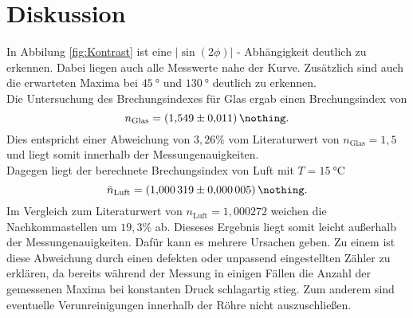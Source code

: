 \FloatBarrier
\newpage
\section{Diskussion}
In Abbilung \ref{fig:Kontrast} ist eine $|\sin{(2\phi)}|$ - Abhängigkeit deutlich zu erkennen.
Dabei liegen auch alle Messwerte nahe der Kurve.
Zusätzlich sind auch die erwarteten Maxima bei $\SI{45}{\degree}$ und $\SI{130}{\degree}$ deutlich zu erkennen. \\
Die Untersuchung des Brechungsindexes für Glas ergab einen Brechungsindex von
\begin{equation}
    n_\text{Glas} = \SI{1.549 \pm 0.011}{\nothing} .
\end{equation}
Dies entspricht einer Abweichung von $3,26 \%$ vom Literaturwert von $n_\text{Glas} = 1,5$ und liegt somit innerhalb der Messungenauigkeiten.  \\
Dagegen liegt der berechnete Brechungsindex von Luft mit $ T = \SI{15}{\celsius} $
\begin{equation}
    \bar{n}_\text{Luft} = \SI{1.000319 \pm 0.000005}{\nothing} .
 \end{equation}
Im Vergleich  zum Literaturwert von $n_\text{Luft} = 1,000272$ \cite{spektrum} weichen die Nachkommastellen um $19,3 \%$ ab. Dieseses Ergebnis liegt somit leicht außerhalb der Messungenauigkeiten. Dafür kann es mehrere Ursachen geben. Zu einem ist diese Abweichung durch einen defekten oder unpassend eingestellten Zähler zu erklären, da bereits während der Messung in einigen Fällen die Anzahl der gemessenen Maxima bei konstanten Druck schlagartig stieg. Zum anderem sind eventuelle Verunreinigungen innerhalb der Röhre nicht auszuschließen.
